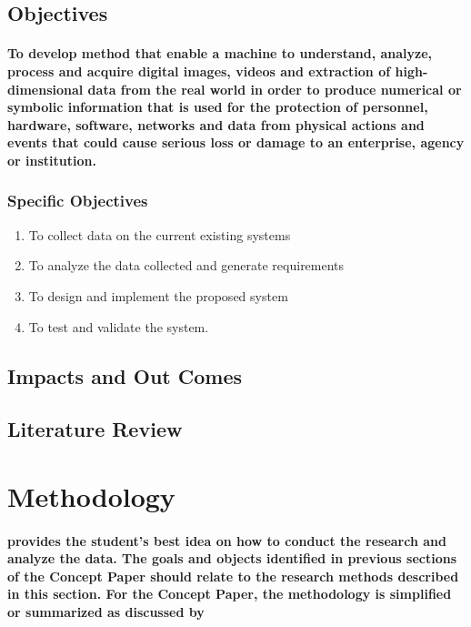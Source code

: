 \documentclass[11pt]{article}
\begin{document}
	 \subsection{\textbf{Objectives}}
	 
	   \paragraph{\textmd{To develop method that enable a machine to understand, analyze, process and acquire digital images, videos and extraction of high-dimensional data from the real world in order to produce numerical or symbolic information that is used for the protection of personnel, hardware, software, networks and data from physical actions and events that could cause serious loss or damage to an enterprise, agency or institution.}}
	   
	   \subsubsection{\textbf{Specific Objectives}}
	   
	   \begin{enumerate}
	   
	   \item To collect data on the current existing systems
	   \item To analyze the data collected and generate requirements
	   \item To design and implement the proposed system 
	   \item To test and validate the system.
	           
	   \end{enumerate} 	  

	   \subsection{\textbf{Impacts and Out Comes}}
	   \subsection{\textbf{Literature Review}}
	   
	   \section{\textbf{Methodology}}
	   \paragraph{\textmd{provides the student’s best idea on how to conduct the research and analyze the data. The goals and objects identified in previous sections of the Concept Paper should relate to the research methods described in this section.  For the Concept Paper, the methodology is simplified or summarized as discussed by }}
	   
	
    	
    	 
       
\end{document}
